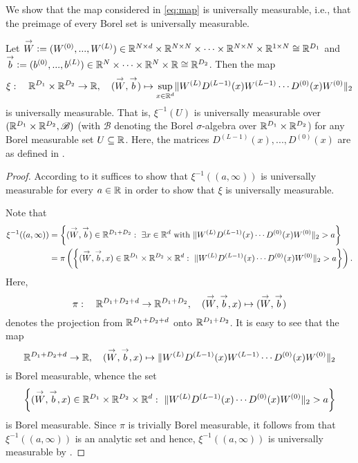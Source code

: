  We show that the map considered in \eqref{eq:map} is universally measurable, i.e., that the preimage of every Borel set is universally measurable. 
\begin{proposition}
Let $\overset{\rightarrow}{W} \mathrel{\mathop:}= (W^{(0)}, ..., W^{(L)}) \in \mathbb{R}^{N \times d} \times \mathbb{R}^{N \times N} \times \cdots \times \mathbb{R}^{N \times N} \times \mathbb{R}^{1 \times N} \cong \mathbb{R}^{D_1}$ and $\overset{\rightarrow}{b} \mathrel{\mathop:}= (b^{(0)}, ..., b^{(L)}) \in \mathbb{R}^N \times \cdots \times \mathbb{R}^N \times \mathbb{R} \cong \mathbb{R}^{D_2}$. Then the map
\begin{equation*}
\xi: \quad \mathbb{R}^{D_1} \times \mathbb{R}^{D_2} \to \mathbb{R} , \quad (\overset{\rightarrow}{W}, \overset{\rightarrow}{b}) \mapsto \underset{x \in \mathbb{R}^d}{\sup} \Vert W^{(L)}D^{(L-1)}(x)W^{(L-1)} \cdots D^{(0)}(x) W^{(0)}\Vert_2
\end{equation*}
is universally measurable. That is, $\xi^{-1}(U)$ is universally measurable over $(\mathbb{R}^{D_1} \times \mathbb{R}^{D_2}, \mathscr{B})$ (with $\mathscr{B}$ denoting the Borel $\sigma$-algebra over $\mathbb{R}^{D_1} \times \mathbb{R}^{D_2}$) for any Borel measurable set $U \subseteq \mathbb{R}$. Here, the matrices $D^{(L-1)}(x), ..., D^{(0)}(x)$ are as defined in .
\end{proposition}
\begin{proof}
According to \cite[Corollary 4.25]{aliprantis_infinite_2006} it suffices to show that $\xi^{-1}((a, \infty))$ is universally measurable for every $a \in \mathbb{R}$ in order to show that $\xi$ is universally measurable. 

Note that
\begin{align*}
\xi^{-1}((a,\infty)) &= \left\{(\overset{\rightarrow}{W}, \overset{\rightarrow}{b}) \in \mathbb{R}^{D_1 + D_2}: \ \exists x \in \mathbb{R}^d \text{ with } \Vert W^{(L)}D^{(L-1)}(x) \cdots D^{(0)}(x) W^{(0)}\Vert_2 > a\right\} \\
&= \pi \left(\left\{ (\overset{\rightarrow}{W}, \overset{\rightarrow}{b}, x) \in \mathbb{R}^{D_1} \times \mathbb{R}^{D_2} \times \mathbb{R}^d: \ \Vert W^{(L)}D^{(L-1)}(x) \cdots D^{(0)}(x) W^{(0)}\Vert_2 > a\right\}\right).
\end{align*}
Here, 
\begin{equation*}
\pi: \quad \mathbb{R}^{D_1 + D_2 + d} \to \mathbb{R}^{D_1 + D_2}, \quad (\overset{\rightarrow}{W}, \overset{\rightarrow}{b}, x) \mapsto (\overset{\rightarrow}{W}, \overset{\rightarrow}{b})
\end{equation*}
denotes the projection from $\mathbb{R}^{D_1 + D_2 + d}$ onto $\mathbb{R}^{D_1 + D_2}$. It is easy to see that the map
\begin{equation*}
\mathbb{R}^{D_1 + D_2 + d} \to \mathbb{R}, \quad (\overset{\rightarrow}{W}, \overset{\rightarrow}{b}, x) \mapsto \Vert W^{(L)}D^{(L-1)}(x)W^{(L-1)} \cdots D^{(0)}(x) W^{(0)}\Vert_2
\end{equation*}
is Borel measurable, whence the set 
\begin{equation*}
\left\{ (\overset{\rightarrow}{W}, \overset{\rightarrow}{b}, x) \in \mathbb{R}^{D_1} \times \mathbb{R}^{D_2} \times \mathbb{R}^d: \ \Vert W^{(L)}D^{(L-1)}(x) \cdots D^{(0)}(x) W^{(0)}\Vert_2 > a\right\}
\end{equation*}
is Borel measurable. Since $\pi$ is trivially Borel measurable, it follows from \cite[Theorem 12.24]{aliprantis_infinite_2006} that $\xi^{-1}((a, \infty))$ is an analytic set and hence, $\xi^{-1}((a, \infty))$ is universally measurable by \cite[Theorem 12.41]{aliprantis_infinite_2006}.
\end{proof}
